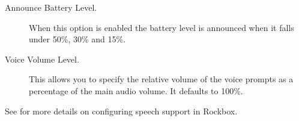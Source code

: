 \begin{description}
  \item[Announce Battery Level.]
    When this option is enabled the battery level is announced when it falls
    under 50\%, 30\% and 15\%.

  \item[Voice Volume Level.]
    This allows you to specify the relative volume of the voice prompts as
    a percentage of the main audio volume.  It defaults to 100\%.

  \end{description}

See  for more details on configuring speech support in Rockbox.
